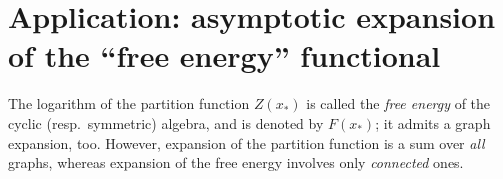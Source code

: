 

\section{Application: asymptotic expansion of the ``free energy'' functional}
The logarithm of the partition function $Z(x_*)$ is called the
\emph{free energy} of the cyclic (resp.\ symmetric) algebra, and is
denoted by $F(x_*)$; it admits a graph expansion, too. However,
expansion of the partition function is a sum over \emph{all} graphs,
whereas expansion of the free energy involves only \emph{connected}
ones.

